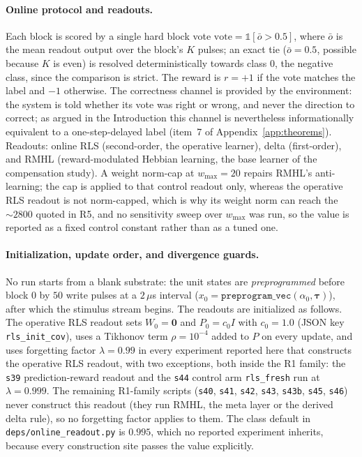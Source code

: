 \documentclass[preprint,12pt]{elsarticle}
\begin{document}
\paragraph{Online protocol and readouts.} Each block is scored by a single
hard block vote $\mathrm{vote}=\mathbb 1[\bar o>0.5]$, where $\bar o$ is the
mean readout output over the block's $K$ pulses; an exact tie
($\bar o=0.5$, possible because $K$ is even) is resolved deterministically
towards class $0$, the negative class, since the comparison is strict. The
reward is $r=+1$ if the vote matches the label and $-1$ otherwise. The
correctness channel is provided by the environment: the system is told
whether its vote was right or wrong, and never the direction to correct; as
argued in the Introduction this channel is nevertheless informationally
equivalent to a one-step-delayed label (item~7 of
Appendix~\ref{app:theorems}). Readouts: online RLS
(second-order, the operative learner), delta (first-order), and RMHL
(reward-modulated Hebbian learning, the base learner of the compensation
study). A
weight norm-cap at $w_{\max}=20$ repairs RMHL's anti-learning; the cap is
applied to that control readout only, whereas the operative RLS readout is
not norm-capped, which is why its weight norm can reach the
$\sim2800$ quoted in R5, and no sensitivity sweep over $w_{\max}$ was run,
so the value is reported as a fixed control constant rather than as a tuned
one.

\paragraph{Initialization, update order, and divergence guards.} No run starts
from a blank substrate: the unit states are \emph{preprogrammed} before block
$0$ by $50$ write pulses at a $2\,\mu$s interval ($x_0=
\texttt{preprogram\_vec}(\alpha_0,\boldsymbol\tau)$), after which the stimulus
stream begins. The readouts are initialized as follows. The operative RLS
readout sets $W_0=\mathbf 0$ and $P_0=c_0 I$ with $c_0=1.0$ (JSON key
\texttt{rls\_init\_cov}), uses a Tikhonov term $\rho=10^{-4}$ added to $P$ on
every update, and uses forgetting factor $\lambda=0.99$ in every experiment
reported here that constructs the operative RLS readout, with two exceptions,
both inside the R1 family: the \texttt{s39} prediction-reward readout and the
\texttt{s44} control arm \texttt{rls\_fresh} run at $\lambda=0.999$. The
remaining R1-family scripts (\texttt{s40}, \texttt{s41}, \texttt{s42},
\texttt{s43}, \texttt{s43b}, \texttt{s45}, \texttt{s46}) never construct this
readout (they run RMHL, the meta layer or the derived delta rule), so no
forgetting factor applies to them. The class default in
\texttt{deps/online\_readout.py} is $0.995$, which no reported experiment
inherits, because every construction site passes the value explicitly.
\end{document}
